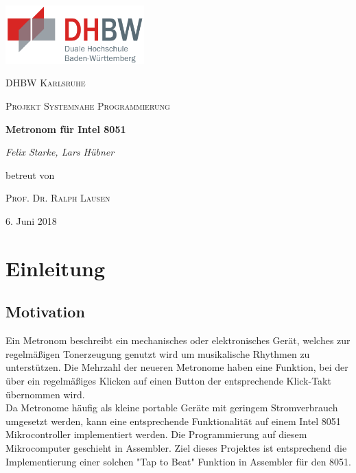 \documentclass[a4paper, 12pt]{scrartcl}
\title{\titel}
\author{\autoren}
\date{\datum}
\def \autoren {Felix Starke, Lars Hübner} %
\def \titel {Metronom für Intel 8051}
\def \arbeit {Projekt Systemnahe Programmierung}
\def \uni {DHBW Karlsruhe}
\def \betreuer {Prof. Dr. Ralph Lausen}
\def \datum {6. Juni 2018}
\begin{document}
\begin{onehalfspace}

\begin{titlepage}
	\centering
	\includegraphics[width=0.4\textwidth]{dhbw.png}\par\vspace{1cm}
	{\scshape\LARGE \uni \par}
	\vspace{1cm}
	{\scshape\Large \arbeit\par}
	\vspace{1.5cm}
	{\huge\bfseries \titel\par}
	\vspace{2cm}
	{\Large\itshape \autoren\par}
	\vfill
	betreut von\par
	\textsc{\betreuer}

	\vfill

	{\large \datum\par}
\end{titlepage}

\newpage
\tableofcontents
\newpage

\section{Einleitung}
\subsection{Motivation}
Ein Metronom beschreibt ein mechanisches oder elektronisches Gerät, welches zur regelmäßigen Tonerzeugung genutzt wird um musikalische Rhythmen zu unterstützen. Die Mehrzahl der neueren Metronome haben eine Funktion, bei der über ein regelmäßiges Klicken auf einen Button der entsprechende Klick-Takt übernommen wird.
\\
Da Metronome häufig als kleine portable Geräte mit geringem Stromverbrauch umgesetzt werden, kann eine entsprechende Funktionalität auf einem Intel 8051 Mikrocontroller implementiert werden. Die Programmierung auf diesem Mikrocomputer geschieht in Assembler. Ziel dieses Projektes ist entsprechend die Implementierung einer solchen "Tap to Beat" Funktion in Assembler für den 8051.


\end{onehalfspace}
\end{document}
